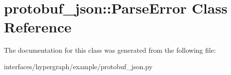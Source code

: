 \hypertarget{classprotobuf__json_1_1ParseError}{
\section{protobuf\_\-json::ParseError Class Reference}
\label{classprotobuf__json_1_1ParseError}
}


The documentation for this class was generated from the following file:\begin{DoxyCompactItemize}
\item 
interfaces/hypergraph/example/protobuf\_\-json.py\end{DoxyCompactItemize}
